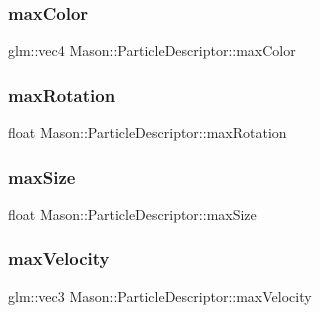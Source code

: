\hypertarget{class_mason_1_1_particle_descriptor_aa755ad8771cf25c71ec868e16cff41e2}{}\label{class_mason_1_1_particle_descriptor_aa755ad8771cf25c71ec868e16cff41e2} 
\subsubsection{\texorpdfstring{max\+Color}{maxColor}}
{\footnotesize\ttfamily glm\+::vec4 Mason\+::\+Particle\+Descriptor\+::max\+Color}

\hypertarget{class_mason_1_1_particle_descriptor_a9590c7ad32834d9cce9c24d530e75609}{}\label{class_mason_1_1_particle_descriptor_a9590c7ad32834d9cce9c24d530e75609} 
\subsubsection{\texorpdfstring{max\+Rotation}{maxRotation}}
{\footnotesize\ttfamily float Mason\+::\+Particle\+Descriptor\+::max\+Rotation}

\hypertarget{class_mason_1_1_particle_descriptor_a394842f237899eb5fcd3091c8dd2ba89}{}\label{class_mason_1_1_particle_descriptor_a394842f237899eb5fcd3091c8dd2ba89} 
\subsubsection{\texorpdfstring{max\+Size}{maxSize}}
{\footnotesize\ttfamily float Mason\+::\+Particle\+Descriptor\+::max\+Size}

\hypertarget{class_mason_1_1_particle_descriptor_afc679429239c6e9c40b5c2e75228e2c1}{}\label{class_mason_1_1_particle_descriptor_afc679429239c6e9c40b5c2e75228e2c1} 
\subsubsection{\texorpdfstring{max\+Velocity}{maxVelocity}}
{\footnotesize\ttfamily glm\+::vec3 Mason\+::\+Particle\+Descriptor\+::max\+Velocity}

